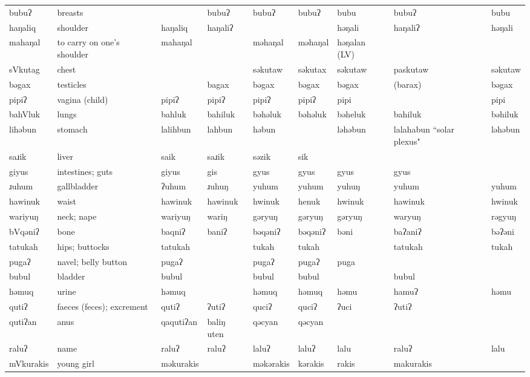 \begin{landscape}
\begin{longtable}{*{9}{p{}}}
\text{*}bubuʔ & breasts &  & bubuʔ & bubuʔ & bubuʔ & bubu & bubuʔ & bubu\\
\text{*}haŋaliq & shoulder & haŋaliq & haŋaliʔ &  &  & həŋali & haŋaliʔ & həŋali\\
\text{*}mahaŋal & to carry on one's shoulder & mahaŋal &  & məhaŋal & məhaŋal & həŋalan (LV) &  & \\
\text{*}sVkutag & chest &  &  & səkutaw & səkutax & səkutaw & paskutaw & səkutaw\\
\text{*}bəgax & testicles &  & bagax & bəgax & bəgax & bəgax & (barax) & bəgax\\
\text{*}pipiʔ & vagina (child) & pipiʔ & pipiʔ & pipiʔ & pipiʔ & pipi &  & pipi\\
\text{*}bahVluk & lungs & bahluk & bahiluk & bəhəluk & bəhəluk & bəheluk & bahiluk & bəhiluk\\
\text{*}lihəbun & stomach & lalihbun & lahbun & həbun &  & ləhəbun & lalahabun ``solar plexus" & ləhəbun\\
\text{*}saɹik & liver & saik & saɹik & səzik & sik &  &  & \\
\text{*}giyus & intestines; guts & giyus & gis & gyus & gyus & gyus & gyus & \\
\text{*}ɹuhum & gallbladder & ʔuhum & ɹuhuŋ & yuhum & yuhum & yuhuŋ & yuhum & yuhum\\
\text{*}hawinuk & waist & hawinuk & hawinuk & hwinuk & henuk & hwinuk & hawinuk & hwinuk\\
\text{*}wariyuŋ & neck; nape & wariyuŋ & wariŋ & gəryuŋ & gəryuŋ & gəryuŋ & waryuŋ & rəgyuŋ\\
\text{*}bVqəniʔ & bone & baqniʔ & baniʔ & bəqəniʔ & bəqəniʔ & bəni & baʔaniʔ & bəʔəni\\
\text{*}tatukah & hips; buttocks & tatukah &  & tukah & tukah &  & tatukah & tukah\\
\text{*}pugaʔ & navel; belly button & pugaʔ &  & pugaʔ & pugaʔ & puga &  & \\
\text{*}bubul & bladder & bubul &  & bubul & bubul &  & bubul & \\
\text{*}həmuq & urine & həmuq &  & həmuq & həmuq & həmu & hamuʔ & həmu\\
\text{*}qutiʔ & faeces (feces); excrement & qutiʔ & ʔutiʔ & quciʔ & quciʔ & ʔuci & ʔutiʔ & \\
\text{*}qutiʔan & anus & qaqutiʔan & baliŋ uten & qəcyan & qəcyan &  &  & \\
\text{*}raluʔ & name & raluʔ & raluʔ & laluʔ & laluʔ & lalu & raluʔ & lalu\\
\text{*}mVkurakis & young girl & məkurakis &  & məkərakis & kərakis & rakis & makurakis & \\

\end{longtable}
\end{landscape}
